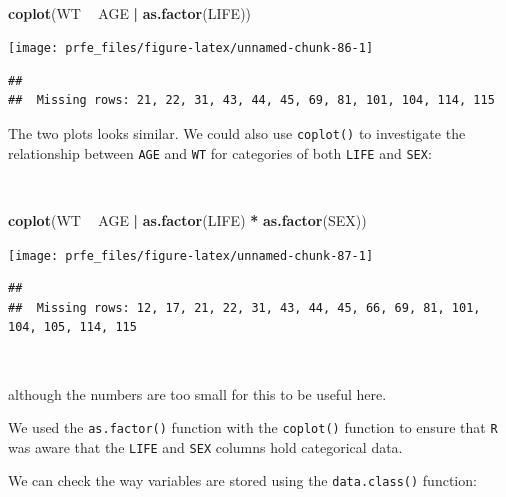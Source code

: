 \documentclass[12pt,a4paper]{book}
\newenvironment{Shaded}{\begin{snugshade}}{\end{snugshade}}
\newcommand{\KeywordTok}[1]{\textcolor[rgb]{0.13,0.29,0.53}{\textbf{#1}}}
\newcommand{\StringTok}[1]{\textcolor[rgb]{0.31,0.60,0.02}{#1}}
\newcommand{\OperatorTok}[1]{\textcolor[rgb]{0.81,0.36,0.00}{\textbf{#1}}}
\newcommand{\NormalTok}[1]{#1}
\theoremstyle{definition}
\theoremstyle{definition}
\theoremstyle{definition}
\theoremstyle{remark}
\begin{document}
~

\begin{Shaded}
\begin{Highlighting}[]
\KeywordTok{coplot}\NormalTok{(WT }\OperatorTok{~}\StringTok{ }\NormalTok{AGE }\OperatorTok{|}\StringTok{ }\KeywordTok{as.factor}\NormalTok{(LIFE))}
\end{Highlighting}
\end{Shaded}

\begin{center}\texttt{[image: prfe\_files/figure-latex/unnamed-chunk-86-1]} \end{center}

\begin{verbatim}
## 
##  Missing rows: 21, 22, 31, 43, 44, 45, 69, 81, 101, 104, 114, 115
\end{verbatim}

\newpage

The two plots looks similar. We could also use \texttt{coplot()} to
investigate the relationship between \texttt{AGE} and \texttt{WT} for
categories of both \texttt{LIFE} and \texttt{SEX}:

~

\begin{Shaded}
\begin{Highlighting}[]
\KeywordTok{coplot}\NormalTok{(WT }\OperatorTok{~}\StringTok{ }\NormalTok{AGE }\OperatorTok{|}\StringTok{ }\KeywordTok{as.factor}\NormalTok{(LIFE) }\OperatorTok{*}\StringTok{ }\KeywordTok{as.factor}\NormalTok{(SEX))}
\end{Highlighting}
\end{Shaded}

\begin{center}\texttt{[image: prfe\_files/figure-latex/unnamed-chunk-87-1]} \end{center}

\begin{verbatim}
## 
##  Missing rows: 12, 17, 21, 22, 31, 43, 44, 45, 66, 69, 81, 101, 104, 105, 114, 115
\end{verbatim}

~

although the numbers are too small for this to be useful here.

We used the \texttt{as.factor()} function with the \texttt{coplot()}
function to ensure that \texttt{R} was aware that the \texttt{LIFE} and
\texttt{SEX} columns hold categorical data.

We can check the way variables are stored using the
\texttt{data.class()} function:
\end{document}
